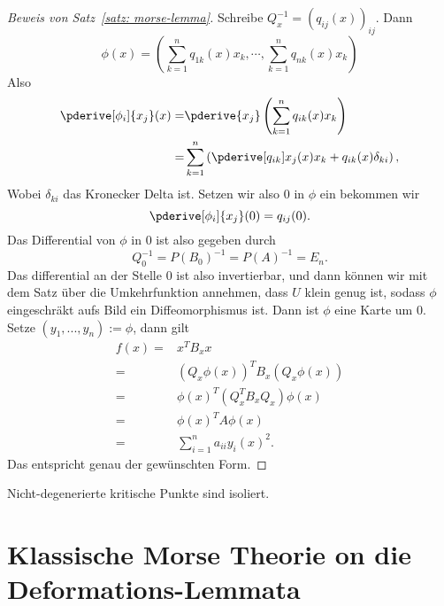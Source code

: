 \begin{proof}[Beweis von Satz~\ref{satz: morse-lemma}]
    Schreibe $Q_x^{-1} = (q_{ij}(x))_{ij}$. Dann
    \[ \phi(x) = \left( 
        \sum_{k = 1}^n q_{1k}(x) x_k, \cdots , \sum_{k = 1}^n q_{nk}(x) x_k
        \right)
    \]
    Also 
    \begin{align*}
        \pderive[\phi_i]{x_j} (x) 
            = & \pderive{x_j} \left( \sum_{k = 1}^n q_{ik} (x) x_k \right) \\
        = & \sum_{k = 1}^n \left( 
            \pderive[q_{ik}]{x_j}(x) x_k + q_{ik}(x) \delta_{ki}
        \right)
    , \end{align*}
    Wobei $\delta_{ki}$ das Kronecker Delta ist. Setzen wir also $0$  in $\phi$ ein
    bekommen wir
    \[ \pderive[\phi_i]{x_j}(0) = q_{ij}(0). \]
    Das Differential von $\phi$ in $0$ ist also gegeben durch
    \[ Q_0^{-1} = P(B_0)^{-1} = P(A)^{-1} = E_n . \]
    Das differential an der Stelle $0$ ist also invertierbar, und dann können wir mit dem 
    Satz über die Umkehrfunktion annehmen, dass $U$ klein genug ist, sodass $\phi$ 
    eingeschräkt aufs Bild ein Diffeomorphismus ist. 
    Dann ist $\phi$ eine Karte um $0$. Setze $(y_1, ..., y_n) := \phi$, dann gilt 
    \begin{align*}
        f(x) = & x^T B_x x \\
        = & (Q_x \phi(x))^T B_x (Q_x \phi(x)) \\
        = & \phi(x)^T (Q_x^T B_x Q_x) \phi(x) \\
        = & \phi(x)^T A \phi(x) \\
        = & \sum_{i = 1}^n a_{ii} y_i(x)^2
    . \end{align*}
    Das entspricht genau der gewünschten Form.
\end{proof}

\begin{corollary}
    Nicht-degenerierte kritische Punkte sind isoliert.
\end{corollary}

\section{Klassische Morse Theorie on die Deformations-Lemmata}

